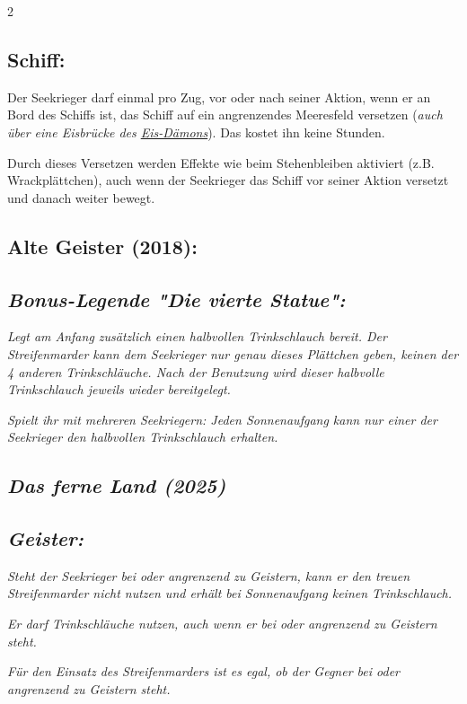 \documentclass[10pt, a4paper, oneside]{book}
\newcommand{\fan}[1]{\textit{#1}}
\begin{document}
\begin{multicols*}{2}
\begin{bgcolor}
\subsection{Schiff:}

Der Seekrieger darf einmal pro Zug, vor oder nach seiner Aktion, wenn er an Bord des Schiffs ist, das Schiff auf ein angrenzendes Meeresfeld versetzen (\fan{auch über eine Eisbrücke des \hyperref[Eis-Dämon]{Eis-Dämons}}). Das kostet ihn keine Stunden.

Durch dieses Versetzen werden Effekte wie beim Stehenbleiben aktiviert (z.B. Wrackplättchen), auch wenn der Seekrieger das Schiff vor seiner Aktion versetzt und danach weiter bewegt.
\supercite{DRidN:FAQ}

\end{bgcolor}


\begin{bgcolor}[color-AG]
\section{Alte Geister (2018):}



\subsection{\fan{Bonus-Legende "Die vierte Statue":}}

\fan{Legt am Anfang zusätzlich einen halbvollen Trinkschlauch bereit. Der Streifenmarder kann dem Seekrieger nur genau dieses Plättchen geben, keinen der 4 anderen Trinkschläuche. Nach der Benutzung wird dieser halbvolle Trinkschlauch jeweils wieder bereitgelegt.}

\fan{Spielt ihr mit mehreren Seekriegern: Jeden Sonnenaufgang kann nur einer der Seekrieger den halbvollen Trinkschlauch erhalten.}

\end{bgcolor}




\begin{bgcolor}
\section{\fan{Das ferne Land (2025)}}

\subsection{\fan{Geister:}}

\fan{Steht der Seekrieger bei oder angrenzend zu Geistern, kann er den treuen Streifenmarder nicht nutzen und erhält bei Sonnenaufgang keinen Trinkschlauch.}

\fan{Er darf Trinkschläuche nutzen, auch wenn er bei oder angrenzend zu Geistern steht.}

\fan{Für den Einsatz des Streifenmarders ist es egal, ob der Gegner bei oder angrenzend zu Geistern steht.} 


\end{bgcolor}



\end{multicols*}
\end{document}

